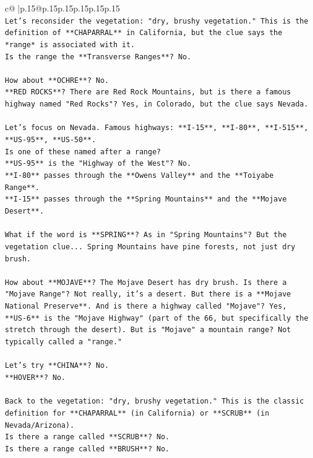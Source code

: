 \documentclass{article}
\begin{document}
{\begin{supertabular}{c@{$\;$}|p{.15\linewidth}@{}p{.15\linewidth}p{.15\linewidth}p{.15\linewidth}p{.15\linewidth}p{.15\linewidth}}
{{{\\ 
\texttt{Let's reconsider the vegetation: "dry, brushy vegetation." This is the definition of **CHAPARRAL** in California, but the clue says the *range* is associated with it.} \\
\texttt{Is the range the **Transverse Ranges**? No.} \\
\\ 
\texttt{How about **OCHRE**? No.} \\
\texttt{**RED ROCKS**? There are Red Rock Mountains, but is there a famous highway named "Red Rocks"? Yes, in Colorado, but the clue says Nevada.} \\
\\ 
\texttt{Let's focus on Nevada. Famous highways: **I{-}15**, **I{-}80**, **I{-}515**, **US{-}95**, **US{-}50**.} \\
\texttt{Is one of these named after a range?} \\
\texttt{**US{-}95** is the "Highway of the West"? No.} \\
\texttt{**I{-}80** passes through the **Owens Valley** and the **Toiyabe Range**.} \\
\texttt{**I{-}15** passes through the **Spring Mountains** and the **Mojave Desert**.} \\
\\ 
\texttt{What if the word is **SPRING**? As in "Spring Mountains"? But the vegetation clue... Spring Mountains have pine forests, not just dry brush.} \\
\\ 
\texttt{How about **MOJAVE**? The Mojave Desert has dry brush. Is there a "Mojave Range"? Not really, it's a desert. But there is a **Mojave National Preserve**. And is there a highway called "Mojave"? Yes, **US{-}6** is the "Mojave Highway" (part of the 66, but specifically the stretch through the desert). But is "Mojave" a mountain range? Not typically called a "range."} \\
\\ 
\texttt{Let's try **CHINA**? No.} \\
\texttt{**HOVER**? No.} \\
\\ 
\texttt{Back to the vegetation: "dry, brushy vegetation." This is the classic definition for **CHAPARRAL** (in California) or **SCRUB** (in Nevada/Arizona).} \\
\texttt{Is there a range called **SCRUB**? No.} \\
\texttt{Is there a range called **BRUSH**? No.} \\
}}}
\end{supertabular}}
\end{document}
